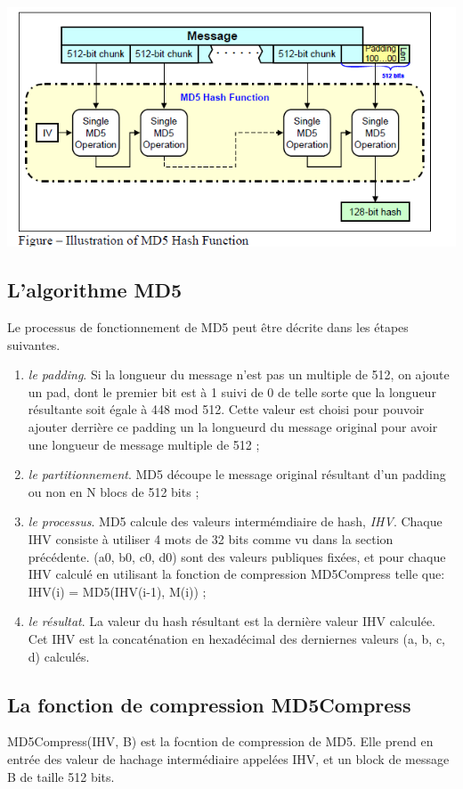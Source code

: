 \documentclass[a4paper,11pt,french]{article}
\begin{document}
\includegraphics[scale=.65]{md5.png}

\subsection{L'algorithme MD5}
Le processus de fonctionnement de MD5 peut être décrite dans les étapes suivantes.
\begin{enumerate}
\item {\it{le padding}}. Si la longueur du message n'est pas un multiple de 512, on ajoute un pad, dont le premier bit est à 1 suivi de 0 de telle sorte que la longueur résultante soit égale à 448 mod 512. Cette valeur est choisi pour pouvoir ajouter derrière ce padding un la longueurd du message original pour avoir une longueur de message multiple de 512 ;
\item {\it{le partitionnement}}. MD5 découpe le message original résultant d'un padding ou non en N blocs de 512 bits ;
\item {\it{le processus}}. MD5 calcule des valeurs intermémdiaire de hash, {\it{IHV}}. Chaque IHV consiste à utiliser 4 mots de 32 bits comme vu dans la section précédente. (a0, b0, c0, d0) sont des valeurs publiques fixées, et pour chaque IHV calculé en utilisant la fonction de compression MD5Compress telle que: IHV(i) = MD5(IHV(i-1), M(i)) ;
\item {\it{le résultat}}. La valeur du hash résultant est la dernière valeur IHV calculée. Cet IHV est la concaténation en hexadécimal des derniernes valeurs (a, b, c, d) calculés.
\end{enumerate}


\subsection{La fonction de compression MD5Compress}
MD5Compress(IHV, B) est la focntion de compression de MD5. Elle prend en entrée des valeur de hachage intermédiaire appelées IHV, et un block de message B de taille 512 bits.\\
\end{document}
